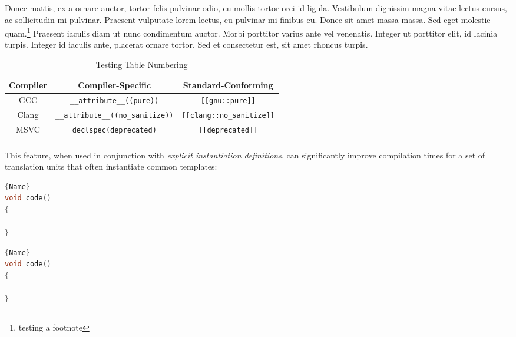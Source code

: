 Donec mattis, ex a ornare auctor, tortor felis pulvinar odio, eu mollis tortor orci id ligula. Vestibulum dignissim magna vitae lectus cursus, ac sollicitudin mi pulvinar. Praesent vulputate lorem lectus, eu pulvinar mi finibus eu. Donec sit amet massa massa. Sed eget molestie quam.\footnote{testing a footnote} Praesent iaculis diam ut nunc condimentum auctor. Morbi porttitor varius ante vel venenatis. Integer ut porttitor elit, id lacinia turpis. Integer id iaculis ante, placerat ornare tortor. Sed et consectetur est, sit amet rhoncus turpis.

\begin{table}[h!] 
\begin{center}
\begin{threeparttable}
\caption{Testing Table Numbering}\label{test-table4}\vspace{1.5ex} 
{\small \begin{tabular}{c|c|c}\thickhline 
\rowcolor[gray]{.9}   {\sffamily\bfseries Compiler} & {\sffamily\bfseries Compiler-Specific} &
{\sffamily\bfseries Standard-Conforming} \\ \hline 
GCC &\texttt{\_\_attribute\_\_((pure))} & \texttt{[[gnu::pure]]} \\ \hline
Clang & \texttt{\_\_attribute\_\_((no\_sanitize))} &\texttt{[[clang::no\_sanitize]]} \\ \hline 
MSVC & \texttt{declspec(deprecated)} & \texttt{[[deprecated]]} \\ \thickhline
\end{tabular}
}
\end{threeparttable} 
\end{center}
\end{table}

This feature, when used in conjunction with \emph{explicit instantiation
definitions}, can significantly improve compilation times for a set of
translation units that often instantiate common templates:

\noindent\begin{minipage}{.45\textwidth}
\begin{lstlisting}[language=C++, caption=code 1,frame=tb]{Name}
void code()
{

}
\end{lstlisting}
\end{minipage}\hfill
\begin{minipage}{.45\textwidth}
\begin{lstlisting}[language=C++, caption=code 2,frame=tb]{Name}
void code()
{

}
\end{lstlisting}
\end{minipage}

